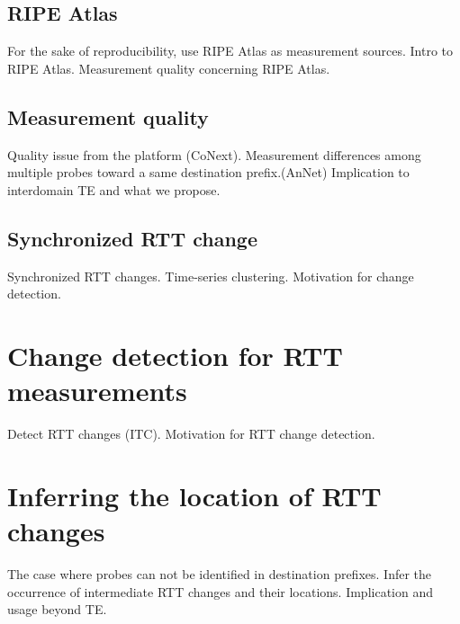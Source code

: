 \subsection{RIPE Atlas}
For the sake of reproducibility, use RIPE Atlas as measurement sources.
Intro to RIPE Atlas.
Measurement quality concerning RIPE Atlas.
\subsection{Measurement quality}
Quality issue from the platform (CoNext).
Measurement differences among multiple probes toward a same destination prefix.(AnNet)
Implication to interdomain TE and what we propose.
\subsection{Synchronized RTT change}
Synchronized RTT changes. Time-series clustering.
Motivation for change detection.

\section{Change detection for RTT measurements}
Detect RTT changes (ITC).
Motivation for RTT change detection.

\section{Inferring the location of RTT changes}
The case where probes can not be identified in destination prefixes.
Infer the occurrence of intermediate RTT changes and their locations.
Implication and usage beyond TE.  
